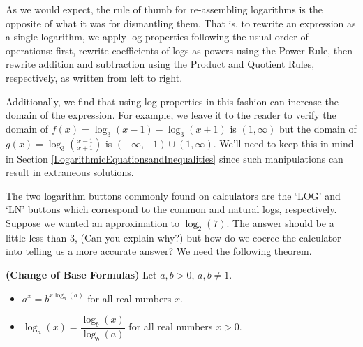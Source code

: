 As we would expect, the rule of thumb for re-assembling logarithms is the opposite of what it was for dismantling them.  That is, to rewrite an expression as a single logarithm, we apply log properties following the usual order of operations:  first,  rewrite coefficients of logs as powers using the Power Rule, then rewrite addition and subtraction using the Product and Quotient Rules, respectively, as written from left to right.

\smallskip

Additionally, we find that using log properties in this fashion can increase the domain of the expression.  For example, we leave it to the reader to verify the domain of $f(x) = \log_{3}(x-1) - \log_{3}(x+1)$ is $(1,\infty)$ but the domain of $g(x) = \log_{3}\left(\frac{x-1}{x+1}\right)$ is $(-\infty, -1) \cup (1, \infty)$.  We'll need to keep this in mind in Section \ref{LogarithmicEquationsandInequalities} since such manipulations can result in extraneous solutions.

\smallskip

The two logarithm buttons commonly found on calculators are the `LOG' and `LN' buttons which correspond to the common and natural logs, respectively.  Suppose we wanted an approximation to $\log_{2}(7)$.  The answer should be a little less than $3$, (Can you explain why?) but how do we coerce the calculator into telling us a more accurate answer?  We need the following theorem.

\smallskip

\colorbox{ResultColor}{\bbm

\begin{thm} \label{changeofbase} \textbf{(Change of Base Formulas)} Let $a,b >0$, $a,b \neq 1$.   

\begin{itemize}

\item  $a^{x} = b^{x \log_{b}(a)}$ for all real numbers $x$.

\item  $\log_{a}(x) = \dfrac{\log_{b}(x)}{\log_{b}(a)}$ for all real numbers $x > 0$.

\end{itemize}

\end{thm}

\ebm}

\smallskip


